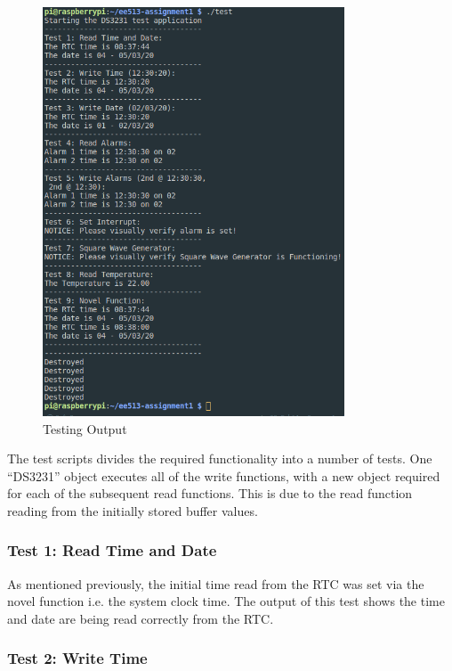 \begin{figure}[H]
	\centering
	\includegraphics[width=0.8\textwidth]{images/testing}
	\caption{Testing Output}
	\label{fig:images-testing}
\end{figure}

The test scripts divides the required functionality into a number of tests. One
``DS3231'' object executes all of the write functions, with a new object
required for each of the subsequent read functions. This is due to the read
function reading from the initially stored buffer values.

\subsubsection{Test 1: Read Time and Date}

As mentioned previously, the initial time read from the RTC was set via the
novel function i.e. the system clock time. The output of this test shows the
time and date are being read correctly from the RTC.

\subsubsection{Test 2: Write Time}

